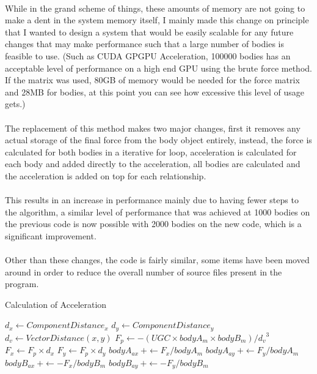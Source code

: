 {\paragraph{}
While in the grand scheme of things, these amounts of memory are not going to make a dent in the system memory itself, I mainly made this change on principle that I wanted to design a system that would be easily scalable for any future changes that may make performance such that a large number of bodies is feasible to use. (Such as CUDA GPGPU Acceleration, 100000 bodies has an acceptable level of performance on a high end GPU using the brute force method. If the matrix was used, 80GB of memory would be needed for the force matrix and 28MB for bodies, at this point you can see how excessive this level of usage gets.)

\paragraph{}
The replacement of this method makes two major changes, first it removes any actual storage of the final force from the body object entirely, instead, the force is calculated for both bodies in a iterative for loop, acceleration is calculated for each body and added directly to the acceleration, all bodies are calculated and the acceleration is added on top for each relationship.

\paragraph{}
This results in an increase in performance mainly due to having fewer steps to the algorithm, a similar level of performance that was achieved at 1000 bodies on the previous code is now possible with 2000 bodies on the new code, which is a significant improvement.

\paragraph{}
Other than these changes, the code is fairly similar, some items have been moved around in order to reduce the overall number of source files present in the program.

\setcounter{algorithm}{1}

\begin{algorithm}[H]
\caption{Calculation of Acceleration}
\begin{algorithmic}[1]
    \STATE $d_x \leftarrow ComponentDistance_x$
    \STATE $d_y \leftarrow ComponentDistance_y$
    \STATE $d_v \leftarrow VectorDistance(x,y)$
    \STATE  
    \STATE $F_p \leftarrow -(UGC \times bodyA_m \times bodyB_m) / {d_v}^3$
    \STATE $F_x \leftarrow F_p \times d_x$
    \STATE $F_y \leftarrow F_p \times d_y$
    \STATE
    \STATE $bodyA_{ax}~+\leftarrow F_x/bodyA_m$
    \STATE $bodyA_{ay}~+\leftarrow F_y/bodyA_m$
    \STATE
    \STATE $bodyB_{ax}~+\leftarrow -F_x/bodyB_m$
    \STATE $bodyB_{ay}~+\leftarrow -F_y/bodyB_m$
  \ENDFOR
\ENDFOR
\end{algorithmic}
\end{algorithm}

}
